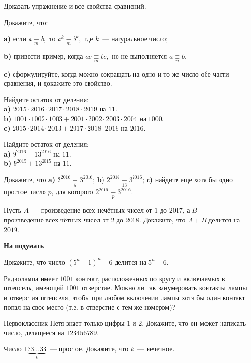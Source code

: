 \begin{problems}

\item Доказать упражнение и все свойства сравнений. 
\item Докажите, что:

\textbf{a)} если $a  \mathop{\equiv}\limits_m b,$   то $a^k  \mathop{\equiv}\limits_m b^k,$  где $k$~--- натуральное число;

\textbf{b)} привести пример, когда $ac \mathop{\equiv}\limits_m bc  ,$ но не выполняется $a \mathop{\equiv}\limits_m b  .$

\textbf{c)} сформулируйте, когда можно сокращать на одно и то же число обе части сравнения, и докажите это свойство.
\item Найдите остаток от деления:\\
\textbf{a)} $2015 \cdot 2016 \cdot 2017 \cdot 2018 \cdot 2019$ на $11$.\\
\textbf{b)} $1001 \cdot 1002 \cdot 1003+2001 \cdot 2002 \cdot 2003\cdot 2004$ на $1000$.\\
\textbf{c)} $2015 \cdot 2014 \cdot 2013+2017 \cdot 2018 \cdot 2019$ на $2016$.
\item Найдите остаток от деления:\\
\textbf{a)} $9^{2016}+13^{2016}$ на $11$.\\
\textbf{b)} $9^{2015}+13^{2015}$ на $11$.
\item Докажите, что \textbf{a)} $2^{2016} \mathop{\equiv}\limits_5 3^{2016}$; \textbf{b)} $2^{2016} \mathop{\equiv}\limits_{13} 3^{2016}$;  \textbf{c)} найдите еще хотя бы одно простое число $p$, для которого $2^{2016} \mathop{\equiv}\limits_{p} 3^{2016}$.
\item  Пусть $A$~--- произведение всех нечётных чисел от $1$ до $2017$, а $B$~--- произведение всех чётных чисел от $2$ до $2018$. Докажите, что $A + B$ делится на $2019$.

\end{problems}
\newpage
\begin{center}
\textbf{На подумать}\\
\end{center}

\begin{problems}
\item Докажите, что число $(5^n-1)^n-6$ делится на $5^n-6$. 

\item Радиолампа имеет $1001$ контакт, расположенных по кругу и включаемых в штепсель, имеющий $1001$ отверстие. Можно ли так занумеровать контакты лампы и отверстия штепселя, чтобы при любом включении лампы хотя бы один контакт попал на свое место (т.е. в отверстие с тем же номером)?  

\item Первоклассник Петя знает только цифры $1$ и $2$. Докажите, что он может написать число, делящееся на $123456789$.

\item Число $1\underbrace{33...33}_k$~--- простое. Докажите, что $k$~--- нечетное. 
\end{problems}
